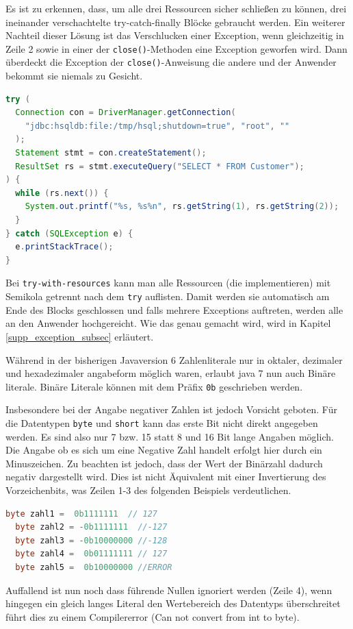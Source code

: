 \documentclass[times, 10pt,twocolumn]{article}
\begin{document}
Es ist zu erkennen, dass, um alle drei Ressourcen sicher schließen zu können, drei ineinander verschachtelte try-catch-finally Blöcke
gebraucht werden. Ein weiterer Nachteil dieser Lösung ist das Verschlucken einer Exception, wenn gleichzeitig in Zeile 2 sowie in einer
der \texttt{close()}-Methoden eine Exception geworfen wird. Dann überdeckt die Exception der \texttt{close()}-Anweisung die andere und der
Anwender bekommt sie niemals zu Gesicht.\cite{javainsel2}

\begin{lstlisting}[language=java,breaklines=true]
try (
  Connection con = DriverManager.getConnection(
	"jdbc:hsqldb:file:/tmp/hsql;shutdown=true", "root", ""
  );
  Statement stmt = con.createStatement();
  ResultSet rs = stmt.executeQuery("SELECT * FROM Customer");
) {
  while (rs.next()) {
	System.out.printf("%s, %s%n", rs.getString(1), rs.getString(2));
  }
} catch (SQLException e) {
  e.printStackTrace();
}
\end{lstlisting}

Bei \texttt{try-with-resources} kann man alle Ressourcen (die  implementieren) mit Semikola getrennt 
nach dem \texttt{try} auflisten. Damit werden sie automatisch am Ende des Blocks geschlossen und falls mehrere Exceptions auftreten,
werden alle an den Anwender hochgereicht. Wie das genau gemacht wird, wird in Kapitel \ref{supp_exception_subsec} erläutert. 


Während in der bisherigen Javaversion 6 Zahlenliterale nur in oktaler, dezimaler und hexadezimaler angabeform möglich waren, erlaubt java 7 nun auch Binäre literale. Binäre Literale können mit dem Präfix \texttt{0b} geschrieben werden.

Insbesondere bei der Angabe negativer Zahlen ist jedoch Vorsicht geboten. Für die Datentypen \texttt{byte} und \texttt{short} kann das erste Bit nicht direkt angegeben werden. Es sind also nur 7 bzw. 15 statt 8 und 16 Bit lange Angaben möglich. Die Angabe ob es sich um eine Negative Zahl handelt erfolgt hier durch ein Minuszeichen. Zu beachten ist jedoch, dass der Wert der Binärzahl dadurch negativ dargestellt wird. Dies ist nicht Äquivalent mit einer Invertierung des Vorzeichenbits, was Zeilen 1-3 des folgenden Beispiels verdeutlichen.\cite{sbJ7literals}
\begin{lstlisting}[language=java,breaklines=true]
  byte zahl1 =  0b1111111  // 127
  byte zahl2 = -0b1111111  //-127
  byte zahl3 = -0b10000000 //-128
  byte zahl4 =  0b01111111 // 127
  byte zahl5 =  0b10000000 //ERROR
\end{lstlisting}
Auffallend ist nun noch dass führende Nullen ignoriert werden (Zeile 4), wenn hingegen ein gleich langes Literal den Wertebereich des Datentyps überschreitet führt dies zu einem Compilererror (Can not convert from int to byte)\cite{sbJ7literals}.\\
\end{document}
